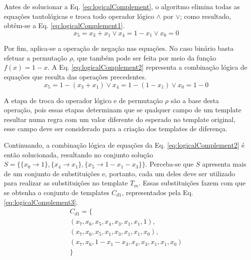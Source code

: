 Antes de solucionar a Eq. \eqref{eq:logicalComplement}, o algoritmo elimina todas as equações tautológicas e troca todo operador lógico $\wedge$ por $\vee$; como resultado, obtêm-se a Eq. \eqref{eq:logicalComplement1}.
\begin{equation}
x_5 = x_3 + x_1 \vee x_4 = 1 - x_1 \vee x_0 = 0
\label{eq:logicalComplement1}
\end{equation}

Por fim,  aplica-se a operação de negação nas equações. No caso binário basta efetuar a permutação $\rho$, que também pode ser feita por meio da função $f(x) = 1 - x$. A Eq. \eqref{eq:logicalComplement2} representa a combinação lógica de equações que resulta das operações precedentes.
\begin{equation}
x_5 = 1 - (x_3 + x_1) \vee x_4 = 1 - (1 - x_1) \vee x_0 = 1 - 0
\label{eq:logicalComplement2}
\end{equation}

A etapa de troca do operador lógico e de permutação $\rho$ são a base desta operação, pois essas etapas determinam que se qualquer campo de um template resultar numa regra com um valor diferente do esperado no template original, esse campo deve ser considerado para a criação dos templates de diferença.

Continuando, a combinação lógica de equações da Eq. \eqref{eq:logicalComplement2} é então solucionada, resultando no conjunto solução $S = \{\{x_0 \to 1\}, \{x_4 \to x_1\}, \{x_5 \to 1 - x_1 - x_3\}\}$. Perceba-se que $S$ apresenta mais de um conjunto de substituições e, portanto, cada um deles deve ser utilizado para realizar as substituições no template $T_m$. Essas substituições fazem com que se obtenha o conjunto de templates $C_{d1}$, representados pela Eq. \eqref{eq:logicalComplement3}. 
\begin{equation}
\begin{split}
C_{d1} = \{\\(x_7, x_6, x_5, x_4, x_3, x_1, x_1, 1), \\(x_7, x_6, x_5, x_1, x_3, x_1, x_1, x_0), \\(x_7, x_6, 1 - x_1 - x_3, x_4, x_3, x_1, x_1, x_0)\\\}
\end{split}
\label{eq:logicalComplement3}
\end{equation}

